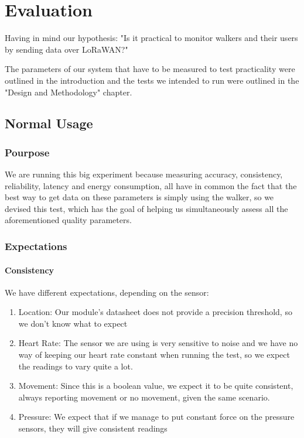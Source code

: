 \chapter{Evaluation}
\label{cha:evaluation}

Having in mind our hypothesis: "Is it practical to monitor walkers and their users by sending data over LoRaWAN?"

The parameters of our system that have to be measured to test practicality were outlined in the introduction and the tests we intended to run were outlined in the "Design and Methodology" chapter.


\section{Normal Usage}

	\subsection{Pourpose}
	We are running this big experiment because measuring accuracy, consistency, reliability, latency and energy consumption, all have in common the fact that the best way to get data on these parameters is simply using the walker, so we devised this test, which has the goal of helping us simultaneously assess all the aforementioned quality parameters.

	\subsection{Expectations}
		\subsubsection{Consistency}
			We have different expectations, depending on the sensor:

			\begin{enumerate}
				\item Location: Our module's datasheet does not provide a precision threshold, so we don't know what to expect
				\item Heart Rate: The sensor we are using is very sensitive to noise and we have no way of keeping our heart rate constant when running the test, so we expect the readings to vary quite a lot.
				\item Movement: Since this is a boolean value, we expect it to be quite consistent, always reporting movement or no movement, given the same scenario.
				\item Pressure: We expect that if we manage to put constant force on the pressure sensors, they will give consistent readings
			\end{enumerate}

